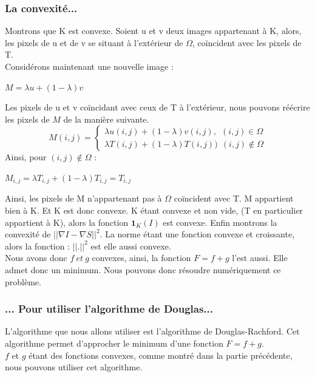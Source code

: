\subsubsection{La convexité...}
Montrons que K est convexe. 
Soient u et v deux images appartenant à K, alors, les pixels de u et de v se situant à l'extérieur de $\Omega$, coïncident avec les pixels de T. \\
Considérons maintenant une nouvelle image : 
\begin{center}
$M = \lambda u+(1-\lambda)v$
\end{center}
Les pixels de u et v coïncidant avec ceux de T à l'extérieur, nous pouvons réécrire les pixels de $M$ de la manière suivante. \\

\begin{equation*} 
M (i,j) = 
\left\{
\begin{aligned}
\lambda u(i,j) +(1-\lambda) v(i,j), \ \ (i,j) \in \Omega\\
\lambda T(i,j) +(1-\lambda )T(i,j))  \ \ (i,j)\notin \Omega
\end{aligned}
\right.
\end{equation*}
Ainsi, pour $(i,j) \notin \Omega$ : \\
\begin{center}
$M_{i,j} = \lambda T_{i,j}+(1-\lambda) T_{i,j} = T_{i,j}$
\end{center}
Ainsi, les pixels de M n'appartenant pas à $\Omega$ coïncident avec T. M appartient bien à K. Et K est donc convexe.\newline
K étant convexe et non vide, (T en particulier appartient à K), alors la fonction $\mathbf{1}_K(I)$ est convexe. \newline
Enfin montrons la convexité de $||\nabla I-\nabla S||^2$.\newline
La norme étant une fonction convexe et croissante, alors la fonction : $||.||^2$ est elle aussi convexe. \\
Nous avons donc $f\ et\ g$ convexes, ainsi, la fonction $F =f+g$ l'est aussi. Elle admet donc un minimum. Nous pouvons donc résoudre numériquement ce problème.
\subsubsection{... Pour utiliser l'algorithme de Douglas...}
L'algorithme que nous allons utiliser est l'algorithme de Douglas-Rachford. Cet algorithme permet d'approcher le minimum d'une fonction $F = f+g$. \\
 $f$ et $g$ étant des fonctions convexes, comme montré dans la partie précédente, nous pouvons utiliser cet algorithme.
